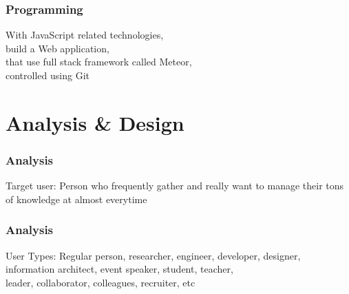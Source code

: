 \documentclass[10pt, compress]{beamer}
\begin{document}
\begin{frame}[fragile]
  \frametitle{Programming}
  \centering

  \begin{figure}[ht]
    \vspace{-1cm}
  \end{figure}

  With \alert{JavaScript} related technologies,\\
  build a Web application,\\
  that use full stack framework called \alert{Meteor},\\
  controlled using \alert{Git}

\end{frame}


\section{Analysis \& Design}


\begin{frame}[fragile]
  \frametitle{Analysis}

    \begin{block}{Target user:}
      Person who frequently gather and really want to manage their tons of knowledge at almost everytime
    \end{block}

\end{frame}


\begin{frame}[fragile]
  \frametitle{Analysis}

    \begin{block}{User Types:}
      Regular person, researcher, engineer, developer, designer,\\
      information architect, event speaker, student, teacher,\\
      leader, collaborator, colleagues, recruiter, etc
    \end{block}

\end{frame}

\end{document}

